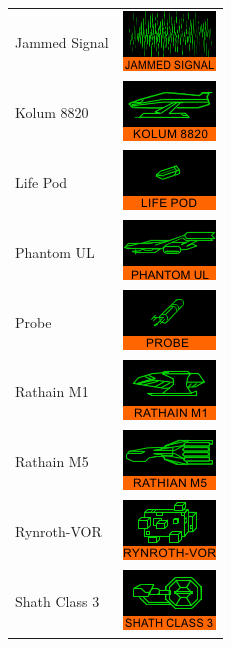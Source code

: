 \begin{itemize}
\begin{tabular}{ | l | l | }
Jammed Signal & \includegraphics{images/ship_jammed_signal.png} \\
Kolum 8820 & \includegraphics{images/ship_kolum_8820.png} \\
Life Pod & \includegraphics{images/ship_lifepod.png} \\
Phantom UL & \includegraphics{images/ship_phantom UL.png} \\
Probe & \includegraphics{images/ship_probe.png} \\
Rathain M1 & \includegraphics{images/ship_rathain_m1.png} \\
Rathain M5 & \includegraphics{images/ship_rathian_m5.png} \\
Rynroth-VOR & \includegraphics{images/ship_rynroth-vor.png} \\
Shath Class 3 & \includegraphics{images/ship_shath_class_3.png} \\

\end{tabular}
\end{itemize}
